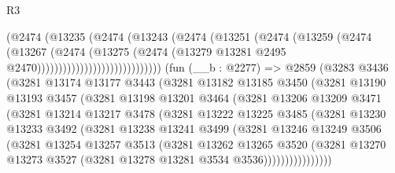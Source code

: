 \begin{lexlean}{R3}
\begin{coremodule}
                                  (@2474
                                    (@13235
                                      (@2474
                                        (@13243
                                          (@2474
                                            (@13251
                                              (@2474
                                                (@13259
                                                  (@2474
                                                    (@13267
                                                      (@2474
                                                        (@13275
                                                          (@2474
                                                            (@13279
                                                              @13281
                                                              @2495
                                                              @2470)))))))))))))))))))))))))))))
    (fun (__b : @2277) =>
    @2859
      (@3283
        @3436
        (@3281
          @13174
          @13177
          @3443
          (@3281
            @13182
            @13185
            @3450
            (@3281
              @13190
              @13193
              @3457
              (@3281
                @13198
                @13201
                @3464
                (@3281
                  @13206
                  @13209
                  @3471
                  (@3281
                    @13214
                    @13217
                    @3478
                    (@3281
                      @13222
                      @13225
                      @3485
                      (@3281
                        @13230
                        @13233
                        @3492
                        (@3281
                          @13238
                          @13241
                          @3499
                          (@3281
                            @13246
                            @13249
                            @3506
                            (@3281
                              @13254
                              @13257
                              @3513
                              (@3281
                                @13262
                                @13265
                                @3520
                                (@3281
                                  @13270
                                  @13273
                                  @3527
                                  (@3281 @13278 @13281 @3534 @3536))))))))))))))))

\end{coremodule}
\end{lexlean}
